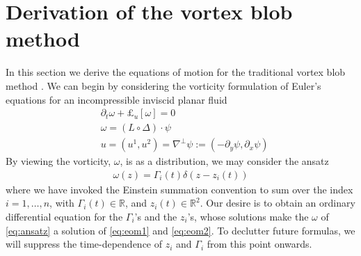 \documentclass[12pt]{amsart}
\begin{document}
\section{Derivation of the vortex blob method}
\label{sec:vortex_blob}
In this section we derive the equations of motion for the traditional
vortex blob method .
We can begin by considering the vorticity formulation of Euler's equations for an incompressible inviscid planar fluid
\begin{align}
  &\partial_t \omega + \pounds_u[ \omega] = 0 \label{eq:eom1} \\
  &\omega = (L \circ \Delta) \cdot \psi \label{eq:eom2} \\
  &u = (u^1,u^2) = \nabla^\perp \psi :=  (- \partial_y \psi, \partial_x \psi)
  \label{eq:u}
\end{align}
By viewing the vorticity, $\omega$, is as a distribution,
we may consider the ansatz
\begin{align}
  \omega(z) = \Gamma_i(t) \delta(z-z_i(t))
  \label{eq:ansatz}
\end{align} 
where we have invoked the Einstein summation convention to sum over 
the index $i=1,\dots,n$,
with $\Gamma_i(t) \in \mathbb{R}$,
and $z_i(t) \in \mathbb{R}^2$.
Our desire is to obtain an ordinary differential equation for the $\Gamma_i$'s and the $z_i$'s,
whose solutions make the $\omega$ of \eqref{eq:ansatz} a solution of \eqref{eq:eom1} and \eqref{eq:eom2}.
To declutter future formulas,
we will suppress the time-dependence of $z_i$ and $\Gamma_i$
from this point onwards.
\end{document}
